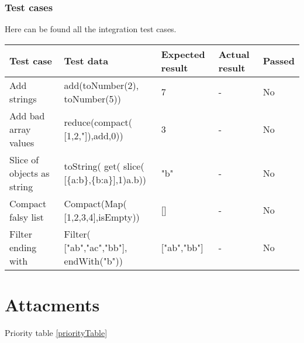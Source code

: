 \documentclass[a4paper, 12pt]{article}
\begin{document}
        \subsubsection{Test cases}  
        Here can be found all the integration test cases.




 
            \begin{table}[h!]
                \begin{tabular}{|p{3cm}|p{4cm}|p{2cm}|p{2cm}|l|}
               \hline 
                Test case                  & Test data                                        & Expected result & Actual result & Passed \\ \hline
                Add strings                & add(toNumber(2), toNumber(5))                     & 7               & -             & No     \\ \hline
                Add bad array values       & reduce(compact( {[}1,2,"{]}),add,0))              & 3               & -             & No     \\ \hline
                Slice of objects as string & toString( get( slice( {[}\{a:b\},\{b:a\}{]},1)a.b)) & "b"             & -             & No     \\ \hline
                Compact falsy list         & Compact(Map( {[}1,2,3,4{]},isEmpty))              & {[}{]}          & -             & No     \\ \hline
                Filter ending with         & Filter( {[}"ab","ac","bb"{]}, endWith("b"))        & {[}"ab","bb"{]} & -             & No    \\ \hline
                \end{tabular}
                \end{table}
\newpage






\section*{Attacments}

Priority table \ref{priorityTable}
\end{document}
